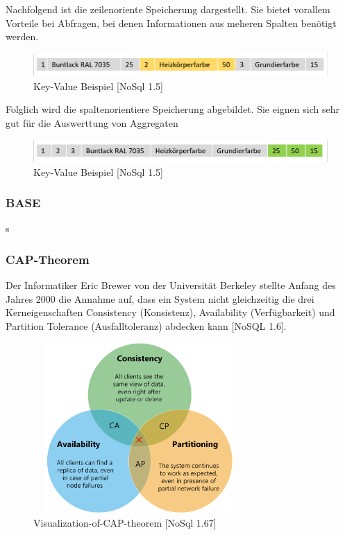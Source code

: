 Nachfolgend ist die zeilenoriente Speicherung dargestellt. Sie bietet vorallem Vorteile bei Abfragen, bei denen Informationen aus meheren Spalten benötigt werden.
\newline


\begin{figure}[h]
\centering
\includegraphics[width=15cm]{images/zeilenorientiert.png}
\caption{Key-Value Beispiel [NoSql 1.5]}
\end{figure}

Folglich wird die spaltenorientiere Speicherung abgebildet. Sie eignen sich sehr gut für die Auswerttung von Aggregaten
\newline


\begin{figure}[h]
\centering
\includegraphics[width=15cm]{images/spaltenorientiert.png}
\caption{Key-Value Beispiel [NoSql 1.5]}
\end{figure}

\subsubsection{BASE}
s
\newline

\subsubsection{CAP-Theorem}
Der Informatiker Eric Brewer von der Universität Berkeley stellte Anfang des Jahres 2000 die Annahme auf, dass ein System nicht gleichzeitig die drei Kerneigenschaften Consistency (Konsistenz), Availability (Verfügbarkeit) und Partition Tolerance (Ausfalltoleranz) abdecken kann [NoSQL 1.6]. 
\newline

\begin{figure}[h]
\centering
\includegraphics[width=8cm, height=6.5cm]{images/Visualization-of-CAP-theorem.png}
\caption{Visualization-of-CAP-theorem [NoSql 1.67]}
\end{figure}

